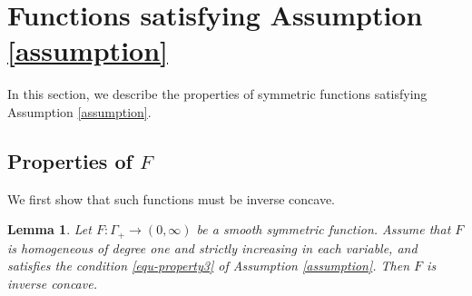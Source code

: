 \documentclass[11pt,reqno]{amsart}
\newtheorem{lemma}[proposition]{Lemma}
\theoremstyle{remark}
\numberwithin{equation}{section}
\begin{document}

\section{Functions satisfying Assumption \ref{assumption}}\label{sec.3}

In this section, we describe the properties of symmetric functions satisfying Assumption \ref{assumption}. 

\subsection{Properties of $F$}
We first show that such functions must be inverse concave. 

\begin{lemma}\label{lem:inverse-concave}
Let $F:\Gamma_+\to (0,\infty)$ be a smooth symmetric function. Assume that $F$ is homogeneous of degree one and strictly increasing in each variable, and satisfies the condition \eqref{equ-property3} of Assumption \ref{assumption}. Then $F$ is inverse concave.
\end{lemma}
\end{document}
